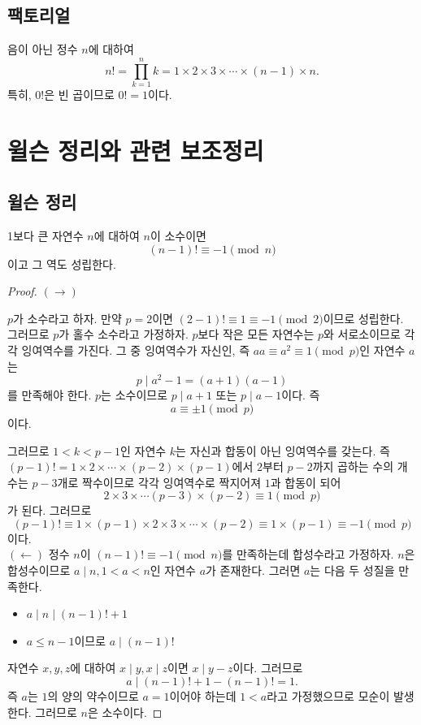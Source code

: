 \documentclass{article}
\begin{document}
\subsection{팩토리얼}
음이 아닌 정수 \(n\)에 대하여
\[n!=\prod_{k=1}^{n}k=1\times2\times3\times \cdots \times (n-1) \times n.\]
특히, \(0!\)은 빈 곱이므로 \(0!=1\)이다.

\section{윌슨 정리와 관련 보조정리}
\subsection{윌슨 정리}
1보다 큰 자연수 \(n\)에 대하여 \(n\)이 소수이면
\[(n-1)! \equiv -1 \pmod n\]
이고 그 역도 성립한다.

\begin{proof}
\((\rightarrow)\)

\(p\)가 소수라고 하자.
만약 \(p=2\)이면 \((2-1)!\equiv1\equiv-1\pmod 2\)이므로 성립한다.
그러므로 \(p\)가 홀수 소수라고 가정하자.
\(p\)보다 작은 모든 자연수는 \(p\)와 서로소이므로 각각 잉여역수를 가진다.
그 중 잉여역수가 자신인, 즉 \(aa \equiv a^2 \equiv1 \pmod p\)인 자연수 \(a\)는
\[p \mid a^2-1 = (a+1)(a-1)\]를 만족해야 한다.
\(p\)는 소수이므로 \(p \mid a + 1\) 또는 \(p \mid a - 1\)이다.
즉 \[a \equiv \pm 1 \pmod p\] 이다.

그러므로 \(1<k<p-1\)인 자연수 \(k\)는 자신과 합동이 아닌 잉여역수를 갖는다.
즉 \((p-1)! = 1 \times 2 \times \cdots \times (p-2) \times (p-1)\)에서 
\(2\)부터 \(p-2\)까지 곱하는 수의 개수는 \(p-3\)개로 짝수이므로 각각 잉여역수로 짝지어져 \(1\)과
합동이 되어 \[2 \times 3 \times \cdots (p-3) \times (p-2) \equiv 1 \pmod p\]가 된다.
그러므로 \[(p-1)! \equiv 1 \times (p-1) \times 2 \times 3 \times \cdots \times (p-2) \equiv 1 \times (p-1) \equiv -1 \pmod p\]이다.\\

\((\leftarrow)\)
정수 \(n\)이 \((n-1)! \equiv -1 \pmod n\)를 만족하는데 합성수라고 가정하자.
\(n\)은 합성수이므로 \(a \mid n, 1 < a < n\)인 자연수 \(a\)가 존재한다.
그러면 \(a\)는 다음 두 성질을 만족한다.
\begin{itemize}
    \item \(a \mid n \mid (n-1)! + 1\)
    \item \(a \le n-1\)이므로 \(a \mid (n-1)!\)
\end{itemize}

자연수 \(x, y, z\)에 대하여 \(x \mid y, x \mid z\)이면 \(x \mid y-z\)이다.
그러므로 \[a \mid (n-1)! + 1 - (n-1)! = 1.\]즉 \(a\)는 \(1\)의 양의 약수이므로 \(a = 1\)이어야 하는데 \(1 < a\)라고 가정했으므로 모순이 발생한다.
그러므로 \(n\)은 소수이다.
\end{proof}
\end{document}
